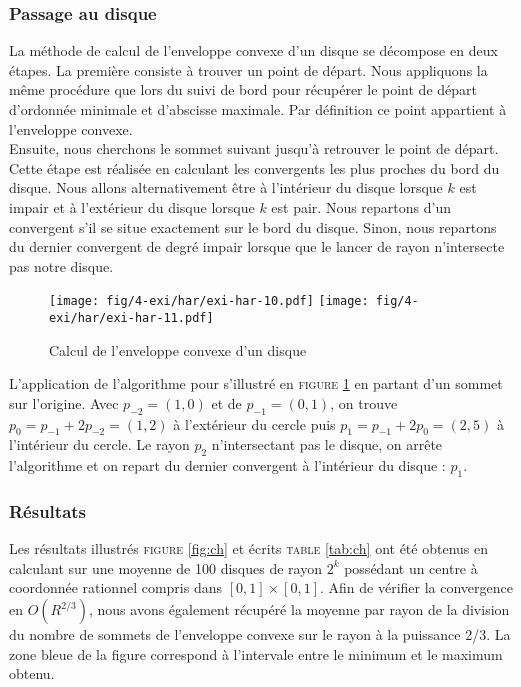 \subsubsection{Passage au disque}


La méthode de calcul de l'enveloppe convexe d'un disque se décompose en deux étapes. La première consiste à trouver un point de départ. Nous appliquons la même procédure que lors du suivi de bord pour récupérer le point de départ d'ordonnée minimale et d'abscisse maximale. Par définition ce point appartient à l'enveloppe convexe.\\

Ensuite, nous cherchons le sommet suivant jusqu'à retrouver le point de départ. Cette étape est réalisée en calculant les convergents les plus proches du bord du disque. Nous allons alternativement être à l'intérieur du disque lorsque $k$ est impair et à l'extérieur du disque lorsque $k$ est pair. Nous repartons d'un convergent s'il se situe exactement sur le bord du disque. Sinon, nous repartons du dernier convergent de degré impair lorsque que le lancer de rayon n'intersecte pas notre disque.\\

\begin{figure}[H]
  \centering
  \texttt{[image: fig/4-exi/har/exi-har-10.pdf]}
  \texttt{[image: fig/4-exi/har/exi-har-11.pdf]}
  \caption{Calcul de l'enveloppe convexe d'un disque}
\label{fig:disque-conv}  
\end{figure}

L'application de l'algorithme pour s'illustré en \textsc{figure} \ref{fig:disque-conv} en partant d'un sommet sur l'origine. Avec $p_{-2} = (1,0)$ et de $p_{-1} = (0,1)$, on trouve $p_{0} = p_{-1} + 2p_{-2} = (1,2)$ à l'extérieur du cercle puis $p_{1} = p_{-1} + 2p_{0} = (2,5)$ à l'intérieur du cercle. Le rayon $p_{2}$ n'intersectant pas le disque, on arrête l'algorithme et on repart du dernier convergent à l'intérieur du disque : $p_{1}$.

\subsubsection{Résultats}

Les résultats illustrés \textsc{figure} \ref{fig:ch} et écrits \textsc{table} \ref{tab:ch} ont été obtenus en calculant sur une moyenne de 100 disques de rayon $2^k$ possédant un centre à coordonnée rationnel compris dans $[0,1]\times[0,1]$. Afin de vérifier la convergence en $O(R^{2/3})$, nous avons également récupéré la moyenne par rayon de la division du nombre de sommets de l'enveloppe convexe sur le rayon à la puissance 2/3. La zone bleue de la figure correspond à l'intervale entre le minimum et le maximum obtenu.

